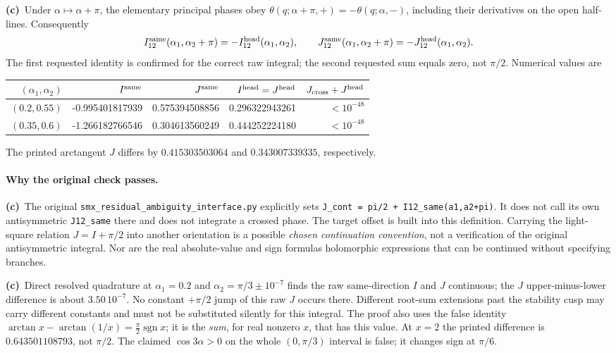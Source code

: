 \documentclass[11pt,a4paper]{article}
\newcommand{\Lc}{\textbf{(c)}\ }
\begin{document}
\Lc Under $\alpha\mapsto\alpha+\pi$, the elementary principal phases obey
$\theta(q;\alpha+\pi,+)=-\theta(q;\alpha,-)$, including their derivatives
on the open half-lines. Consequently
\begin{equation}
 I^{\rm same}_{12}(\alpha_1,\alpha_2+\pi)
 =-I^{\rm head}_{12}(\alpha_1,\alpha_2),\qquad
 J^{\rm same}_{12}(\alpha_1,\alpha_2+\pi)
 =-J^{\rm head}_{12}(\alpha_1,\alpha_2).
 \label{eq:truecross}
\end{equation}
The first requested identity is confirmed for the correct raw integral;
the second requested sum equals zero, not $\pi/2$. Numerical values are
\begin{center}\small
\begin{tabular}{rrrrr}\toprule
$(\alpha_1,\alpha_2)$ & $I^{\rm same}$ & $J^{\rm same}$ & $I^{\rm head}=J^{\rm head}$ & $J_{\rm cross}+J^{\rm head}$\\\midrule
$(0.2,0.55)$ & -0.995401817939 & 0.575394508856 & 0.296322943261 & $<10^{-48}$\\
$(0.35,0.6)$ & -1.266182766546 & 0.304613560249 & 0.444252224180 & $<10^{-48}$\\\bottomrule
\end{tabular}
\end{center}
The printed arctangent $J$ differs by $0.415303503064$ and
$0.343007339335$, respectively.

\paragraph{Why the original check passes.}
\Lc The original \texttt{smx\_residual\_ambiguity\_interface.py} explicitly
sets \texttt{J\_cont = pi/2 + I12\_same(a1,a2+pi)}. It does not call its
own antisymmetric \texttt{J12\_same} there and does not integrate a crossed
phase. The target offset is built into this definition. Carrying the
light-square relation $J=I+\pi/2$ into another orientation is a possible
\emph{chosen continuation convention}, not a verification of the original
antisymmetric integral. Nor are the real absolute-value and sign formulas
holomorphic expressions that can be continued without specifying branches.

\Lc Direct resolved quadrature at $\alpha_1=0.2$ and
$\alpha_2=\pi/3\pm10^{-7}$ finds the raw same-direction $I$ and $J$
continuous; the $J$ upper-minus-lower difference is about
$3.50\,10^{-7}$. No constant $+\pi/2$ jump of this raw $J$ occurs there.
Different root-sum extensions past the stability cusp may carry different
constants and must not be substituted silently for this integral.
The proof also uses the false identity
$\arctan x-\arctan(1/x)=\frac\pi2\operatorname{sgn}x$; it is the
\emph{sum}, for real nonzero $x$, that has this value. At $x=2$ the
printed difference is $0.643501108793$, not $\pi/2$.
The claimed $\cos3\alpha>0$ on the whole $(0,\pi/3)$ interval is false;
it changes sign at $\pi/6$.
\end{document}
